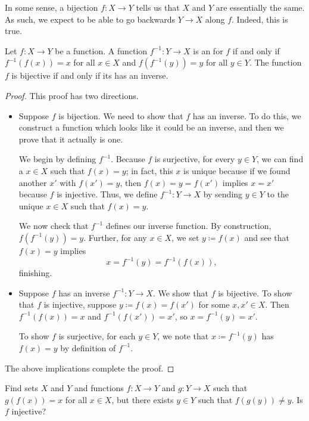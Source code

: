 \documentclass[../main.tex]{subfiles}
\begin{document}
In some sense, a bijection $f\colon X\to Y$ tells us that $X$ and $Y$ are essentially the same. As such, we expect to be able to go backwards $Y\to X$ along $f$. Indeed, this is true.
\begin{prop} \label{prop:bij-is-iso}
    Let $f\colon X\to Y$ be a function. A function $f^{-1}\colon Y\to X$ is an  for $f$ if and only if $f^{-1}(f(x))=x$ for all $x\in X$ and $f\left(f^{-1}(y)\right)=y$ for all $y\in Y$. The function $f$ is bijective if and only if its has an inverse.
\end{prop}
\begin{proof}
    This proof has two directions.
    \begin{itemize}
        \item Suppose $f$ is bijection. We need to show that $f$ has an inverse. To do this, we construct a function which looks like it could be an inverse, and then we prove that it actually is one.
        
        We begin by defining $f^{-1}$. Because $f$ is surjective, for every $y \in Y$, we can find a $x \in X$ such that $f(x) = y$; in fact, this $x$ is unique because if we found another $x'$ with $f(x')=y$, then $f(x)=y=f(x')$ implies $x=x'$ because $f$ is injective. Thus, we define $f^{-1}\colon Y\to X$ by sending $y\in Y$ to the unique $x\in X$ such that $f(x)=y$.
        
        We now check that $f^{-1}$ defines our inverse function. By construction, $f\left(f^{-1}(y)\right)=y$. Further, for any $x\in X$, we set $y\coloneqq f(x)$ and see that $f(x)=y$ implies
        \[x=f^{-1}(y)=f^{-1}(f(x)),\]
        finishing.
        
        \item Suppose $f$ has an inverse $f^{-1}\colon Y\to X$. We show that $f$ is bijective. To show that $f$ is injective, suppose $y\coloneqq f(x)=f(x')$ for some $x,x'\in X$. Then $f^{-1}(f(x))=x$ and $f^{-1}(f(x'))=x'$, so $x=f^{-1}(y)=x'$.

        To show $f$ is surjective, for each $y\in Y$, we note that $x\coloneqq f^{-1}(y)$ has $f(x)=y$ by definition of $f^{-1}$.
    \end{itemize}
    The above implications complete the proof.
\end{proof}
\begin{exe}
    Find sets $X$ and $Y$ and functions $f\colon X\to Y$ and $g\colon Y\to X$ such that $g(f(x))=x$ for all $x\in X$, but there exists $y\in Y$ such that $f(g(y))\ne y$. Is $f$ injective?
\end{exe}
\end{document}
